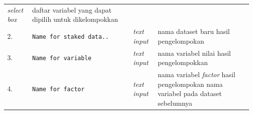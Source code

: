 \documentclass[12pt,]{krantz}
\begin{document}
\begin{longtable}[]{@{}llll@{}}
\begin{minipage}[t]{0.09\columnwidth}
\emph{select box}\strut
\end{minipage} & \begin{minipage}[t]{0.60\columnwidth}\raggedright
daftar variabel yang dapat dipilih untuk dikelompokkan\strut
\end{minipage}\tabularnewline
\begin{minipage}[t]{0.04\columnwidth}\raggedright
2.\strut
\end{minipage} & \begin{minipage}[t]{0.15\columnwidth}\raggedright
\texttt{Name\ for\ staked\ data..}\strut
\end{minipage} & \begin{minipage}[t]{0.09\columnwidth}\raggedright
\emph{text input}\strut
\end{minipage} & \begin{minipage}[t]{0.60\columnwidth}\raggedright
nama dataset baru hasil pengelompokan\strut
\end{minipage}\tabularnewline
\begin{minipage}[t]{0.04\columnwidth}\raggedright
3.\strut
\end{minipage} & \begin{minipage}[t]{0.15\columnwidth}\raggedright
\texttt{Name\ for\ variable}\strut
\end{minipage} & \begin{minipage}[t]{0.09\columnwidth}\raggedright
\emph{text input}\strut
\end{minipage} & \begin{minipage}[t]{0.60\columnwidth}\raggedright
nama variabel nilai hasil pengelompokkan\strut
\end{minipage}\tabularnewline
\begin{minipage}[t]{0.04\columnwidth}\raggedright
4.\strut
\end{minipage} & \begin{minipage}[t]{0.15\columnwidth}\raggedright
\texttt{Name\ for\ factor}\strut
\end{minipage} & \begin{minipage}[t]{0.09\columnwidth}\raggedright
\emph{text input}\strut
\end{minipage} & \begin{minipage}[t]{0.60\columnwidth}\raggedright
nama variabel \emph{factor} hasil pengelompokan nama variabel pada dataset sebelumnya\strut
\end{minipage}\tabularnewline
\bottomrule
\end{longtable}
\end{document}
